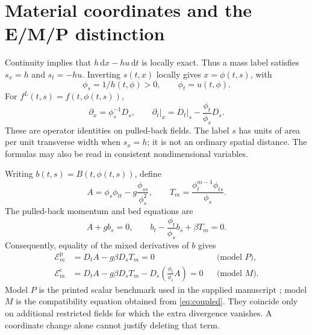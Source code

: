 \documentclass[11pt,a4paper,oneside]{report}
\numberwithin{equation}{chapter}
\newcommand{\E}{\mathcal E}
\newcommand{\dd}{\mathrm d}
\begin{document}
\section{Material coordinates and the E/M/P distinction}
Continuity implies that $h\,\dd x-hu\,\dd t$ is locally exact. Thus a mass label satisfies $s_x=h$ and $s_t=-hu$. Inverting $s(t,x)$ locally gives $x=\phi(t,s)$, with
\begin{equation}
\phi_s=1/h(t,\phi)>0,\qquad \phi_t=u(t,\phi).
\end{equation}
For $f^L(t,s)=f(t,\phi(t,s))$,
\begin{equation}\label{eq:chain}
\partial_x=\phi_s^{-1}D_s,\qquad
\partial_t\big|_x=D_t\big|_s-\frac{\phi_t}{\phi_s}D_s.
\end{equation}
These are operator identities on pulled-back fields. The label $s$ has units of area per unit transverse width when $s_x=h$; it is not an ordinary spatial distance. The formulas may also be read in consistent nondimensional variables.

Writing $b(t,s)=B(t,\phi(t,s))$, define
\begin{equation}
A=\phi_s\phi_{tt}-g\frac{\phi_{ss}}{\phi_s^2},\qquad
T_m=\frac{\phi_t^{m-1}\phi_{ts}}{\phi_s}.
\end{equation}
The pulled-back momentum and bed equations are
\begin{equation}\label{eq:coupled}
A+gb_s=0,\qquad b_t-\frac{\phi_t}{\phi_s}b_s+\beta T_m=0.
\end{equation}
Consequently, equality of the mixed derivatives of $b$ gives
\begin{align}
\E_m^{\mathrm p}&=D_tA-g\beta D_sT_m=0 &&\text{(model $P$)},\label{eq:printed}\\
\E_m^{\mathrm c}&=D_tA-g\beta D_sT_m-D_s\!\left(\frac{\phi_t}{\phi_s}A\right)=0 &&\text{(model $M$)}.\label{eq:corrected}
\end{align}
Model $P$ is the printed scalar benchmark used in the supplied manuscript \cite{projectdraft,ap}; model $M$ is the compatibility equation obtained from \eqref{eq:coupled}. They coincide only on additional restricted fields for which the extra divergence vanishes. A coordinate change alone cannot justify deleting that term.
\end{document}
